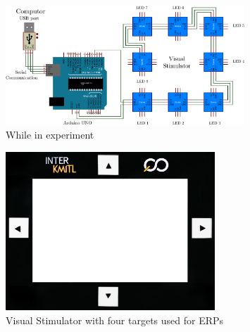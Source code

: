 \begin{figure}[ht]
	\centering
	\includegraphics[width=0.8\textwidth]{chapter6/arduinosheet.pdf}
	\caption{While in experiment}
\end{figure}

\begin{figure}[ht]
	\centering
	\includegraphics[width=0.7\textwidth]{chapter7/frame_4.jpg}
	\caption{Visual Stimulator with four targets used for ERPs}
\end{figure}

